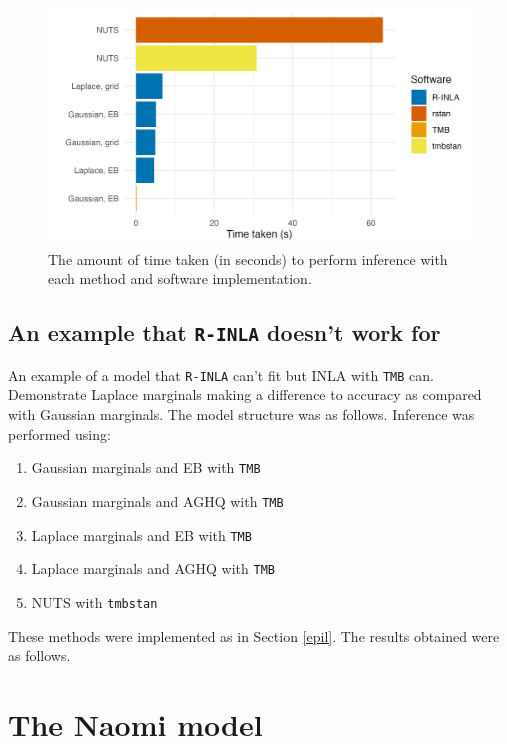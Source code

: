 \documentclass[a4paper, nobind]{templates/ociamthesis}
\providecommand{\tightlist}{%
  \setlength{\itemsep}{0pt}\setlength{\parskip}{0pt}}
\begin{document}
\begin{figure}
\includegraphics[width=0.95\linewidth]{figures/naomi-aghq/epil-time} \caption{The amount of time taken (in seconds) to perform inference with each method and software implementation.}\label{fig:epil-time}
\end{figure}

\hypertarget{unknown}{%
\subsection{\texorpdfstring{An example that \texttt{R-INLA} doesn't work for}{An example that R-INLA doesn't work for}}\label{unknown}}

An example of a model that \texttt{R-INLA} can't fit but INLA with \texttt{TMB} can.
Demonstrate Laplace marginals making a difference to accuracy as compared with Gaussian marginals.
The model structure was as follows.
Inference was performed using:

\begin{enumerate}
\def\labelenumi{\arabic{enumi}.}
\tightlist
\item
  Gaussian marginals and EB with \texttt{TMB}
\item
  Gaussian marginals and AGHQ with \texttt{TMB}
\item
  Laplace marginals and EB with \texttt{TMB}
\item
  Laplace marginals and AGHQ with \texttt{TMB}
\item
  NUTS with \texttt{tmbstan}
\end{enumerate}

These methods were implemented as in Section \ref{epil}.
The results obtained were as follows.

\hypertarget{naomi}{%
\section{The Naomi model}\label{naomi}}
\end{document}
